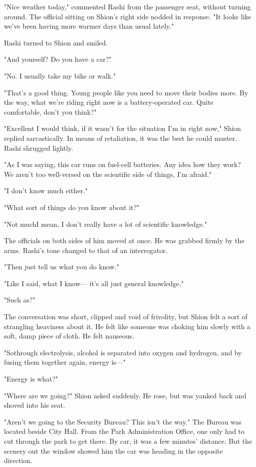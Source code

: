 "Nice weather today," commented Rashi from the passenger seat, without
turning around. The official sitting on Shion's right side nodded in
response. "It looks like we've been having more warmer days than usual
lately."

Rashi turned to Shion and smiled.

"And yourself? Do you have a car?"

"No. I usually take my bike or walk."

"That's a good thing. Young people like you need to move their bodies
more. By the way, what we're riding right now is a battery-operated car.
Quite comfortable, don't you think?"

"Excellent I would think, if it wasn't for the situation I'm in right
now," Shion replied sarcastically. In means of retaliation, it was the
best he could muster. Rashi shrugged lightly.

"As I was saying, this car runs on fuel-cell batteries. Any idea how
they work? We aren't too well-versed on the scientific side of things,
I'm afraid."

"I don't know much either."

"What sort of things do you know about it?"

"Not much\el I mean, I don't really have a lot of scientific knowledge."

The officials on both sides of him moved at once. He was grabbed firmly
by the arms. Rashi's tone changed to that of an interrogator.

"Then just tell us what you do know."

"Like I said, what I know--- it's all just general knowledge."

"Such as?"

The conversation was short, clipped and void of frivolity, but Shion
felt a sort of strangling heaviness about it. He felt like someone was
choking him slowly with a soft, damp piece of cloth. He felt nauseous.

"So\el through electrolysis, alcohol is separated into oxygen and
hydrogen, and by fusing them together again, energy is---"

"Energy is what?"

"Where are we going?" Shion asked suddenly. He rose, but was yanked back
and shoved into his seat.

"Aren't we going to the Security Bureau? This isn't the way." The Bureau
was located beside City Hall. From the Park Administration Office, one
only had to cut through the park to get there. By car, it was a few
minutes' distance. But the scenery out the window showed him the car was
heading in the opposite direction.

